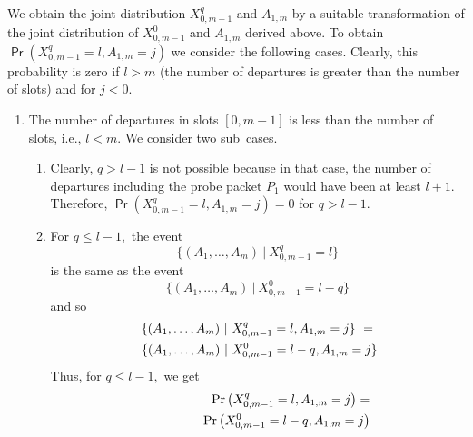 \documentclass[11pt]{article}
\newcommand{\prob}[1]{\mathsf{\Pr}\left(#1\right)}
\begin{document}
We obtain the joint distribution $X_{0,m-1}^q$ and $A_{1,m}$ by a
suitable transformation of the joint distribution of $X_{0,m-1}^0$ and
$A_{1,m}$ derived above. To obtain $\prob{X_{0,m-1}^q=l, A_{1,m}=j}$
we consider the following cases. Clearly, this probability is zero if
$l > m$ (the number of departures is greater than the number of slots)
and for $j < 0.$


\begin{enumerate}
\item The number of departures in slots $[0,m-1]$ is less than the
  number of slots, i.e., $l < m.$ We consider two sub~cases.
  \begin{enumerate}
  \item Clearly, $q > l-1$ is not possible because in that case, the
    number of departures including the probe packet $P_1$ would have
    been at least $l+1.$ Therefore, $\prob{X_{0,m-1}^q=l, A_{1,m}=j}
    =0$ for $q > l-1.$
  \item For $q \leq l-1,$ the event 
\begin{displaymath}
     \{ ( A_1,\ldots,A_m) \ | \ X_{0,m-1}^q=l \}
   \end{displaymath}
is the same as the event 
\begin{displaymath}
      \{( A_1,\ldots,A_m) \ | \ X_{0,m-1}^0=l-q \}      
    \end{displaymath}
and so 
\begin{eqnarray*}
      && \hspace{-0.25in} \{(A_1,\ldots,A_m) \ | \ X_{0,m-1}^q=l,
      A_{1,m}=j\} \ = \ \\ 
      && \hspace{-0.1in} \{( A_1,\ldots,A_m) \ | \  X_{0,m-1}^0=l-q,
      A_{1,m}=j \}  
    \end{eqnarray*}
    Thus, for $q \leq l-1,$ we get
    \begin{eqnarray*}
      && \prob{X_{0,m-1}^q=l, A_{1,m}=j} = \\
      && \hspace{0.5in}\prob{X_{0,m-1}^0=l-q, A_{1,m}=j} 
    \end{eqnarray*} 
\end{enumerate}


\end{enumerate}
\end{document}
